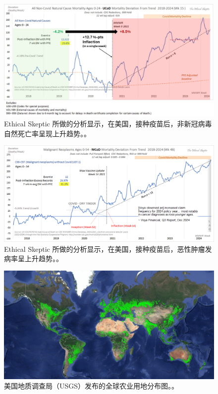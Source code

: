 \documentclass[10pt,twocolumn,letterpaper]{article}
\begin{document}
\begin{figure}[t]
\begin{center}
\includegraphics[width=1\textwidth]{tes1.jpeg}
\end{center}
   \caption{Ethical Skeptic 所做的分析显示，在美国，接种疫苗后，非新冠病毒自然死亡率呈现上升趋势。\cite{42}。}
   \label{fig:18}
\end{figure}

\begin{figure}[t]
\begin{center}
\includegraphics[width=1\textwidth]{tes2.png}
\end{center}
   \caption{Ethical Skeptic 所做的分析显示，在美国，接种疫苗后，恶性肿瘤发病率呈上升趋势。\cite{42}。}
   \label{fig:19}
\end{figure}

\clearpage
\twocolumn

\begin{figure}[t]
\begin{center}
\includegraphics[width=1\textwidth]{farmcrop.PNG}
\end{center}
\caption{美国地质调查局（USGS）发布的全球农业用地分布图。\cite{45}。}
\label{fig:20}
\end{figure}
\end{document}
